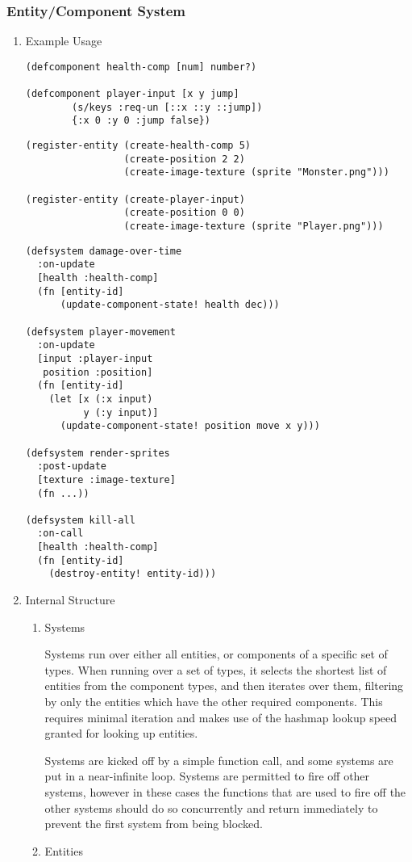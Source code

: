 \documentclass[11pt]{article}
\begin{document}
\subsubsection{Entity/Component System}
\label{sec:orgd75571b}
\begin{enumerate}
\item Example Usage
\label{sec:orga1ee5e6}
\begin{verbatim}
(defcomponent health-comp [num] number?)

(defcomponent player-input [x y jump]
        (s/keys :req-un [::x ::y ::jump])
        {:x 0 :y 0 :jump false})
\end{verbatim}
\begin{verbatim}
(register-entity (create-health-comp 5)
                 (create-position 2 2)
                 (create-image-texture (sprite "Monster.png")))

(register-entity (create-player-input)
                 (create-position 0 0)
                 (create-image-texture (sprite "Player.png")))
\end{verbatim}
\begin{verbatim}
(defsystem damage-over-time
  :on-update
  [health :health-comp]
  (fn [entity-id]
      (update-component-state! health dec)))

(defsystem player-movement
  :on-update
  [input :player-input
   position :position]
  (fn [entity-id]
    (let [x (:x input)
          y (:y input)]
      (update-component-state! position move x y)))

(defsystem render-sprites
  :post-update
  [texture :image-texture]
  (fn ...))

(defsystem kill-all
  :on-call
  [health :health-comp]
  (fn [entity-id]
    (destroy-entity! entity-id)))
\end{verbatim}
\item Internal Structure
\label{sec:org2a02b37}
\begin{enumerate}
\item Systems
\label{sec:orga629c32}

Systems run over either all entities, or components of a specific set of types. When running over a
set of types,  it selects the shortest list of entities from the component types, and then iterates
over them,  filtering by only the entities which have the other required components.  This requires
minimal iteration and makes use of the hashmap lookup speed granted for looking up entities.

Systems are kicked off by a simple function call, and some systems are put in a near-infinite loop.
Systems are permitted to fire off other systems, however in these cases the functions that are used
to fire off the other systems should do so concurrently and return immediately to prevent the first
system from being blocked.
\item Entities
\label{sec:org8dff2fe}


\end{enumerate}
\end{enumerate}
\end{document}
